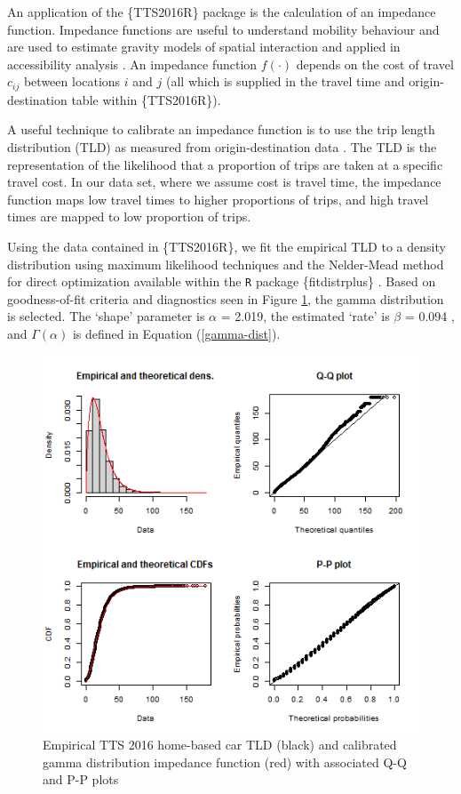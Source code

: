 \documentclass[Royal,times,sageh]{sagej}
\begin{document}
An application of the \{TTS2016R\} package is the calculation of an
impedance function. Impedance functions are useful to understand
mobility behaviour and are used to estimate gravity models of spatial
interaction \citep{wilson1971, haynes_gravity_1985} and applied in
accessibility analysis
\citep{hansen_how_1959, talen_assessing_1998, paez_jobs_2013, barboza_balancing_2021}.
An impedance function \(f(\cdot)\) depends on the cost of travel
\(c_{ij}\) between locations \(i\) and \(j\) (all which is supplied in
the travel time and origin-destination table within \{TTS2016R\}).

A useful technique to calibrate an impedance function is to use the trip
length distribution (TLD) as measured from origin-destination data
\citep{horbachov_theoretical_2018, batista_estimation_2019}. The TLD is
the representation of the likelihood that a proportion of trips are
taken at a specific travel cost. In our data set, where we assume cost
is travel time, the impedance function maps low travel times to higher
proportions of trips, and high travel times are mapped to low proportion
of trips.

Using the data contained in \{TTS2016R\}, we fit the empirical TLD to a
density distribution using maximum likelihood techniques and the
Nelder-Mead method for direct optimization available within the
\texttt{R} package \{fitdistrplus\} \citep{fitdistrplus_2015}. Based on
goodness-of-fit criteria and diagnostics seen in Figure
\ref{fig:TLD-Gamma-plot}, the gamma distribution is selected. The
`shape' parameter is \(\alpha\) = 2.019, the estimated `rate' is
\(\beta\) = 0.094 , and \(\Gamma(\alpha)\) is defined in Equation
(\ref{gamma-dist}).

\begin{figure}

{\centering \includegraphics[width=0.75\linewidth]{images/impedance_function} 

}

\caption{\label{fig:TLD-Gamma-plot}Empirical TTS 2016 home-based car TLD (black) and calibrated gamma distribution impedance function (red) with associated Q-Q and P-P plots}\label{fig:TLD-Gamma-plot}
\end{figure}
\end{document}
